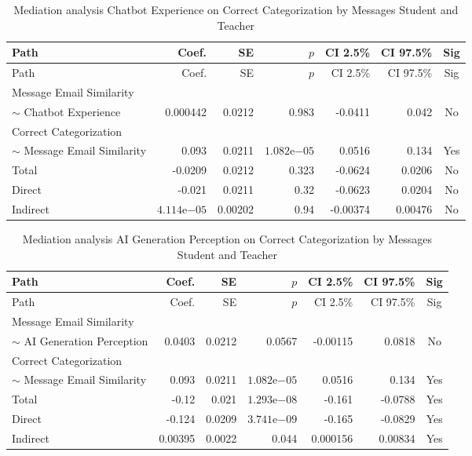 \begin{longtable}{lrrrrrc}
            \caption{Mediation analysis Chatbot Experience on Correct Categorization by  Messages Student and Teacher}\label{tab:mediation Chatbot Experience on Correct Categorization by  Messages Student and Teacher}\\
            \toprule
            Path & Coef. & SE & $p$ & CI 2.5\% & CI 97.5\% & Sig \\
            \midrule
            \endfirsthead
            \toprule
            Path & Coef. & SE & $p$ & CI 2.5\% & CI 97.5\% & Sig \\
            \midrule
            \endhead
            \bottomrule
            \endfoot
            Message Email Similarity\\ $\sim$ Chatbot Experience & 0.000442 & 0.0212 & 0.983 & -0.0411 & 0.042 & No \\
Correct Categorization\\ $\sim$ Message Email Similarity & 0.093 & 0.0211 & $1.082\mathrm{e}{-05}$ & 0.0516 & 0.134 & Yes \\
Total & -0.0209 & 0.0212 & 0.323 & -0.0624 & 0.0206 & No \\
Direct & -0.021 & 0.0211 & 0.32 & -0.0623 & 0.0204 & No \\
Indirect & $4.114\mathrm{e}{-05}$ & 0.00202 & 0.94 & -0.00374 & 0.00476 & No \\
\end{longtable}

\begin{longtable}{lrrrrrc}
            \caption{Mediation analysis AI Generation Perception on Correct Categorization by  Messages Student and Teacher}\label{tab:mediation AI Generation Perception on Correct Categorization by  Messages Student and Teacher}\\
            \toprule
            Path & Coef. & SE & $p$ & CI 2.5\% & CI 97.5\% & Sig \\
            \midrule
            \endfirsthead
            \toprule
            Path & Coef. & SE & $p$ & CI 2.5\% & CI 97.5\% & Sig \\
            \midrule
            \endhead
            \bottomrule
            \endfoot
            Message Email Similarity\\ $\sim$ AI Generation Perception & 0.0403 & 0.0212 & 0.0567 & -0.00115 & 0.0818 & No \\
Correct Categorization\\ $\sim$ Message Email Similarity & 0.093 & 0.0211 & $1.082\mathrm{e}{-05}$ & 0.0516 & 0.134 & Yes \\
Total & -0.12 & 0.021 & $1.293\mathrm{e}{-08}$ & -0.161 & -0.0788 & Yes \\
Direct & -0.124 & 0.0209 & $3.741\mathrm{e}{-09}$ & -0.165 & -0.0829 & Yes \\
Indirect & 0.00395 & 0.0022 & 0.044 & 0.000156 & 0.00834 & Yes \\
\end{longtable}

